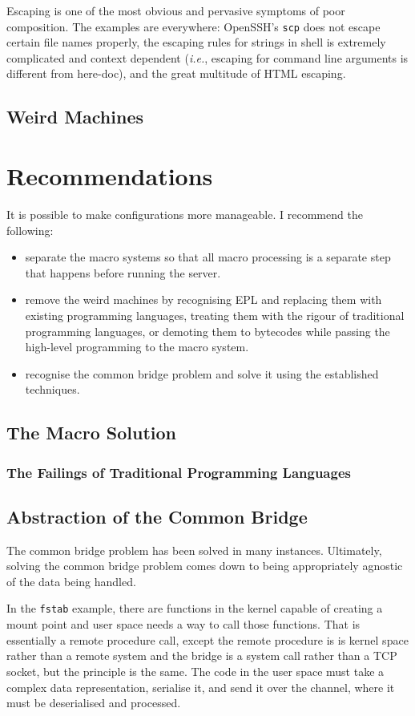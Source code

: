\documentclass[letterpaper,twocolumn,10pt]{article}
\begin{document}
Escaping is one of the most obvious and pervasive symptoms of poor composition. The examples are everywhere: OpenSSH's \texttt{scp} does not escape certain file names properly, the escaping rules for strings in shell is extremely complicated and context dependent (\emph{i.e.}, escaping for command line arguments is different from here-doc), and the great multitude of HTML escaping.

\subsection{Weird Machines}


\section{Recommendations}
It is possible to make configurations more manageable. I recommend the following:

\begin{itemize}
\item separate the macro systems so that all macro processing is a separate step that happens before running the server.
\item remove the weird machines by recognising EPL and replacing them with existing programming languages, treating them with the rigour of traditional programming languages, or demoting them to bytecodes while passing the high-level programming to the macro system.
\item recognise the common bridge problem and solve it using the established techniques.
\end{itemize}

\subsection{The Macro Solution}
\subsubsection{The Failings of Traditional Programming Languages}
\subsection{Abstraction of the Common Bridge}
The common bridge problem has been solved in many instances. Ultimately, solving the common bridge problem comes down to being appropriately agnostic of the data being handled.

In the \texttt{fstab} example, there are functions in the kernel capable of creating a mount point and user space needs a way to call those functions. That is essentially a remote procedure call, except the remote procedure is is kernel space rather than a remote system and the bridge is a system call rather than a TCP socket, but the principle is the same. The code in the user space must take a complex data representation, serialise it, and send it over the channel, where it must be deserialised and processed.
\end{document}
